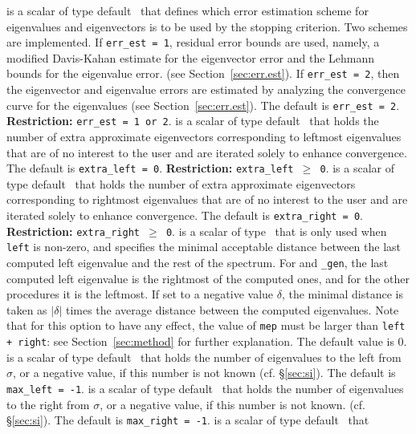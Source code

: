 \begin{description}
%
is a scalar of type default \Integer\ that
defines which error estimation scheme 
for eigenvalues and eigenvectors
is to be used by the stopping criterion.
Two schemes are implemented.
If {\tt err\_est = 1}, residual error bounds are used,
namely,
a modified Davis-Kahan estimate for the eigenvector error
and
the Lehmann bounds for the eigenvalue error.
(see Section~\ref{sec:err.est}).
If {\tt err\_est = 2}, 
then the eigenvector and eigenvalue errors
are estimated by analyzing the convergence curve
for the eigenvalues (see Section~\ref{sec:err.est}).
The default is {\tt err\_est = 2}.
{\bf Restriction:} {\tt err\_est = 1 {\rm or} 2}.
%
is a scalar of type default \Integer\ that
holds the number of extra approximate eigenvectors
corresponding to leftmost eigenvalues
that are of no interest to the user
and are iterated solely to enhance convergence.
The default is {\tt extra\_left = 0}.
{\bf Restriction:} {\tt extra\_left $\ge$ 0}.
%
is a scalar of type default \Integer\ that
holds the number of extra approximate eigenvectors
corresponding to rightmost eigenvalues
that are of no interest to the user
and are iterated solely to enhance convergence.
The default is {\tt extra\_right = 0}.
{\bf Restriction:} {\tt extra\_right $\ge$ 0}.
%
is a scalar of type \REALDP\
that is only used when
{\tt left} is non-zero, and
specifies the minimal acceptable distance
between the last computed left eigenvalue
and the rest of the spectrum.
For {\tt \solver} and {\tt \solver\_gen},
the last computed left eigenvalue
is the rightmost of the computed ones,
and for the other procedures
it is the leftmost.
If set to a negative value $\delta$,
the minimal distance is taken as
$|\delta|$ times the average distance between the computed eigenvalues.
Note that for this option to have any effect,
the value of {\tt mep} must be larger than
{\tt left + right}: see Section~\ref{sec:method}
for further explanation.
The default value is 0.
%
is a scalar of type default \Integer\ that
holds the number of eigenvalues to the left from $\sigma$,
or a negative value, if this number is not known
(cf. \S\ref{sec:si}).
The default is {\tt max\_left = -1}.
%
is a scalar of type default \Integer\ that
holds the number of eigenvalues to the right from $\sigma$,
or a negative value, if this number is not known.
(cf. \S\ref{sec:si}).
The default is {\tt max\_right = -1}.
%
 is a scalar of type default \Logical\ that

\end{description}
